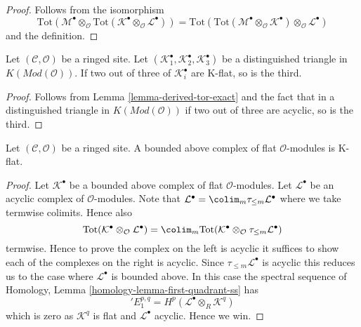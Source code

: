 \begin{proof}
Follows from the isomorphism
$$
\text{Tot}(\mathcal{M}^\bullet \otimes_\mathcal{O}
\text{Tot}(\mathcal{K}^\bullet \otimes_\mathcal{O} \mathcal{L}^\bullet))
=
\text{Tot}(\text{Tot}(\mathcal{M}^\bullet \otimes_\mathcal{O}
\mathcal{K}^\bullet) \otimes_\mathcal{O} \mathcal{L}^\bullet)
$$
and the definition.
\end{proof}

\begin{lemma}
\label{lemma-K-flat-two-out-of-three}
Let $(\mathcal{C}, \mathcal{O})$ be a ringed site.
Let $(\mathcal{K}_1^\bullet, \mathcal{K}_2^\bullet, \mathcal{K}_3^\bullet)$
be a distinguished triangle in $K(\textit{Mod}(\mathcal{O}))$.
If two out of three of $\mathcal{K}_i^\bullet$ are K-flat, so is the third.
\end{lemma}

\begin{proof}
Follows from
Lemma \ref{lemma-derived-tor-exact}
and the fact that in a distinguished triangle in
$K(\textit{Mod}(\mathcal{O}))$
if two out of three are acyclic, so is the third.
\end{proof}

\begin{lemma}
\label{lemma-bounded-flat-K-flat}
Let $(\mathcal{C}, \mathcal{O})$ be a ringed site. A bounded above complex
of flat $\mathcal{O}$-modules is K-flat.
\end{lemma}

\begin{proof}
Let $\mathcal{K}^\bullet$ be a bounded above complex of flat
$\mathcal{O}$-modules. Let $\mathcal{L}^\bullet$ be an acyclic complex
of $\mathcal{O}$-modules. Note that
$\mathcal{L}^\bullet = \colim_m \tau_{\leq m}\mathcal{L}^\bullet$
where we take termwise colimits. Hence also
$$
\text{Tot}(\mathcal{K}^\bullet \otimes_\mathcal{O} \mathcal{L}^\bullet)
=
\colim_m \text{Tot}(
\mathcal{K}^\bullet \otimes_\mathcal{O} \tau_{\leq m}\mathcal{L}^\bullet)
$$
termwise. Hence to prove the complex on the left is acyclic it suffices
to show each of the complexes on the right is acyclic. Since
$\tau_{\leq m}\mathcal{L}^\bullet$ is acyclic this reduces us to the
case where $\mathcal{L}^\bullet$ is bounded above.
In this case the spectral sequence of
Homology, Lemma \ref{homology-lemma-first-quadrant-ss}
has
$$
{}'E_1^{p, q} = H^p(\mathcal{L}^\bullet \otimes_R \mathcal{K}^q)
$$
which is zero as $\mathcal{K}^q$ is flat and $\mathcal{L}^\bullet$ acyclic.
Hence we win.
\end{proof}

